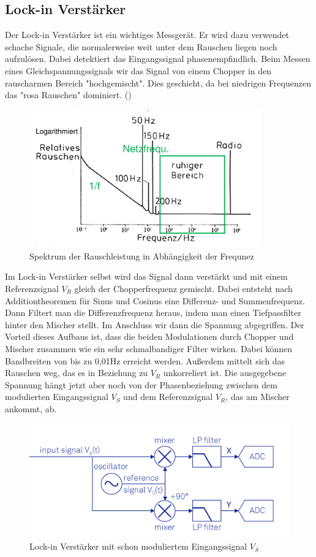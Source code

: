 
\subsection{Lock-in Verstärker}

Der Lock-in Verstärker ist ein wichtiges Messgerät. Er wird dazu verwendet schache Signale, die normalerweise weit unter dem Rauschen liegen noch aufzulösen.
Dabei detektiert das Eingangssignal phasenempfindlich. Beim Messen eines Gleichspannungssignals wir das Signal von einem Chopper in den rauscharmen Bereich "hochgemischt". 
Dies geschieht, da bei niedrigen Frequenzen das "rosa Rauschen" dominiert. (\cite{Herink2021}) 

\begin{figure}[h]
    \centering
    \includegraphics[width = 10cm ]{Bilder/Rauschen.png}
    \caption{Spektrum der Rauschleistung in Abhängigkeit der Frequnez \protect \footnotemark}
\end{figure}
Im Lock-in Verstärker selbst wird das Signal dann verstärkt und mit einem Referenzsignal $V_R$ gleich der Chopperfrequenz gemischt. Dabei entsteht nach Additiontheoremen für Sinus und Cosinus eine
Differenz- und Summenfrequenz. Dann Filtert man die Differenzfrequenz heraus, indem man einen Tiefpassfilter hinter den Mischer stellt. Im Anschluss wir dann die Spannung abgegriffen. 
Der Vorteil dieses Aufbaus ist, dass die beiden Modulationen durch Chopper und Mischer zusammen wie ein sehr schmalbandiger Filter wirken. Dabei können Bandbreiten von bis zu 0,01Hz erreicht werden. 
Außerdem mittelt sich das Rauschen weg, das es in Beziehung zu $V_R$ unkorreliert ist. Die ausgegebene Spannung hängt jetzt aber noch von der Phasenbeziehung zwischen dem 
modulierten Eingangssignal $V_S$ und dem Referenzsignal $V_R$, das am Mischer ankommt, ab.
\begin{figure}[ht]
    \centering
    \includegraphics[width = 12cm]{Bilder/Lockin.png}
    \caption{Lock-in Verstärker mit schon moduliertem Eingangssignal $V_S$ \protect \footnotemark}
    \label{lockin}
\end{figure}
